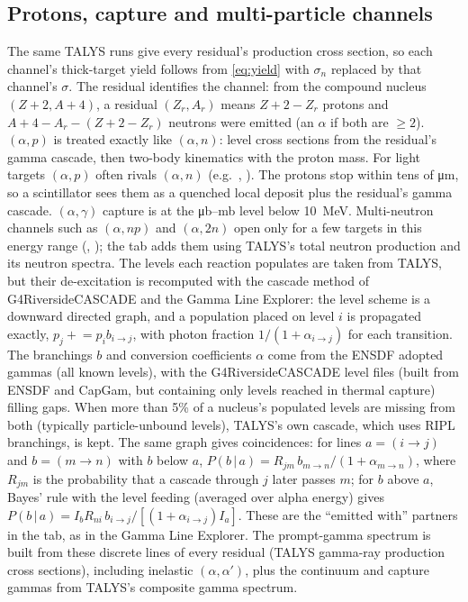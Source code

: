 \subsection{Protons, capture and multi-particle channels}
The same TALYS runs give every residual's production cross section, so each channel's thick-target yield follows from \cref{eq:yield} with $\sigma_n$ replaced by that channel's $\sigma$. The residual identifies the channel: from the compound nucleus $(Z+2, A+4)$, a residual $(Z_r, A_r)$ means $Z+2-Z_r$ protons and $A+4-A_r-(Z+2-Z_r)$ neutrons were emitted (an $\alpha$ if both are $\geq 2$). $(\alpha,p)$ is treated exactly like $(\alpha,n)$: level cross sections from the residual's gamma cascade, then two-body kinematics with the proton mass. For light targets $(\alpha,p)$ often rivals $(\alpha,n)$ (e.g.\ , ). The protons stop within tens of \si{\micro m}, so a scintillator sees them as a quenched local deposit plus the residual's gamma cascade. $(\alpha,\gamma)$ capture is at the \si{\micro b}--mb level below \SI{10}{MeV}. Multi-neutron channels such as $(\alpha,np)$ and $(\alpha,2n)$ open only for a few targets in this energy range (, ); the tab adds them using TALYS's total neutron production and its neutron spectra. The levels each reaction populates are taken from TALYS, but their de-excitation is recomputed with the cascade method of G4RiversideCASCADE and the Gamma Line Explorer: the level scheme is a downward directed graph, and a population placed on level $i$ is propagated exactly, $p_j \mathrel{+}= p_i b_{i\to j}$, with photon fraction $1/(1+\alpha_{i\to j})$ for each transition. The branchings $b$ and conversion coefficients $\alpha$ come from the ENSDF adopted gammas (all known levels), with the G4RiversideCASCADE level files (built from ENSDF and CapGam, but containing only levels reached in thermal capture) filling gaps. When more than 5\% of a nucleus's populated levels are missing from both (typically particle-unbound levels), TALYS's own cascade, which uses RIPL branchings, is kept. The same graph gives coincidences: for lines $a = (i\to j)$ and $b = (m\to n)$ with $b$ below $a$, $P(b\,|\,a) = R_{jm}\,b_{m\to n}/(1+\alpha_{m\to n})$, where $R_{jm}$ is the probability that a cascade through $j$ later passes $m$; for $b$ above $a$, Bayes' rule with the level feeding (averaged over alpha energy) gives $P(b\,|\,a) = I_b R_{ni}\,b_{i\to j}/[(1+\alpha_{i\to j}) I_a]$. These are the ``emitted with'' partners in the tab, as in the Gamma Line Explorer. The prompt-gamma spectrum is built from these discrete lines of every residual (TALYS gamma-ray production cross sections), including inelastic $(\alpha,\alpha')$, plus the continuum and capture gammas from TALYS's composite gamma spectrum.

